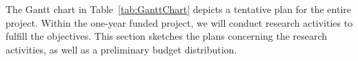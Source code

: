 
The Gantt chart in Table~\ref{tab:GanttChart} depicts a tentative plan for the entire project. Within the one-year funded project, we will conduct research activities to fulfill the objectives. This section sketches the plans concerning the research activities, as well as a preliminary budget distribution.






